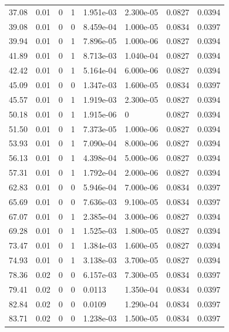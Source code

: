 \documentclass[preview]{standalone}
\begin{document}
{{\begin{tabular}{L{1.2cm}C{1.2cm} C{0.3cm}C{0.5cm} C{1.4cm}C{1.4cm} C{1.4cm}C{1.4cm}}
  37.08  &  0.01  & 0     &  1 &  1.951e-03  & 2.300e-05  & 0.0827 &  0.0394   \\ 
  39.08  &  0.01  & 0     &  0 &  8.459e-04  & 1.000e-05  & 0.0834 &  0.0397   \\ 
  39.94  &  0.01  & 0     &  1 &  7.896e-05  & 1.000e-06  & 0.0827 &  0.0394   \\ 
  41.89  &  0.01  & 0     &  1 &  8.713e-03  & 1.040e-04  & 0.0827 &  0.0394   \\ 
  42.42  &  0.01  & 0     &  1 &  5.164e-04  & 6.000e-06  & 0.0827 &  0.0394   \\ 
  45.09  &  0.01  & 0     &  0 &  1.347e-03  & 1.600e-05  & 0.0834 &  0.0397   \\ 
  45.57  &  0.01  & 0     &  1 &  1.919e-03  & 2.300e-05  & 0.0827 &  0.0394   \\ 
  50.18  &  0.01  & 0     &  1 &  1.915e-06  & 0  & 0.0827 &  0.0394   \\ 
  51.50  &  0.01  & 0     &  1 &  7.373e-05  & 1.000e-06  & 0.0827 &  0.0394   \\ 
  53.93  &  0.01  & 0     &  1 &  7.090e-04  & 8.000e-06  & 0.0827 &  0.0394   \\ 
  56.13  &  0.01  & 0     &  1 &  4.398e-04  & 5.000e-06  & 0.0827 &  0.0394   \\ 
  57.31  &  0.01  & 0     &  1 &  1.792e-04  & 2.000e-06  & 0.0827 &  0.0394   \\ 
  62.83  &  0.01  & 0     &  0 &  5.946e-04  & 7.000e-06  & 0.0834 &  0.0397   \\ 
  65.69  &  0.01  & 0     &  0 &  7.636e-03  & 9.100e-05  & 0.0834 &  0.0397   \\ 
  67.07  &  0.01  & 0     &  1 &  2.385e-04  & 3.000e-06  & 0.0827 &  0.0394   \\ 
  69.28  &  0.01  & 0     &  1 &  1.525e-03  & 1.800e-05  & 0.0827 &  0.0394   \\ 
  73.47  &  0.01  & 0     &  1 &  1.384e-03  & 1.600e-05  & 0.0827 &  0.0394   \\ 
  74.93  &  0.01  & 0     &  1 &  3.138e-03  & 3.700e-05  & 0.0827 &  0.0394   \\ 
  78.36  &  0.02  & 0     &  0 &  6.157e-03  & 7.300e-05  & 0.0834 &  0.0397   \\ 
  79.41  &  0.02  & 0     &  0 &  0.0113  & 1.350e-04  & 0.0834 &  0.0397   \\ 
  82.84  &  0.02  & 0     &  0 &  0.0109  & 1.290e-04  & 0.0834 &  0.0397   \\ 
  83.71  &  0.02  & 0     &  0 &  1.238e-03  & 1.500e-05  & 0.0834 &  0.0397   \\ 

\end{tabular}}}
\end{document}
